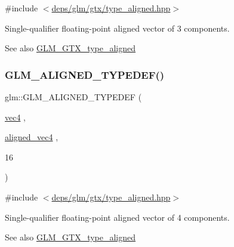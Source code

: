 {\ttfamily \#include $<$\hyperlink{gtx_2type__aligned_8hpp}{deps/glm/gtx/type\+\_\+aligned.\+hpp}$>$}

Single-\/qualifier floating-\/point aligned vector of 3 components. \begin{DoxySeeAlso}{See also}
\hyperlink{group__gtx__type__aligned}{G\+L\+M\+\_\+\+G\+T\+X\+\_\+type\+\_\+aligned} 
\end{DoxySeeAlso}
\mbox{\label{group__gtx__type__aligned_ga12fe7b9769c964c5b48dcfd8b7f40198}} 
\subsubsection{\texorpdfstring{G\+L\+M\+\_\+\+A\+L\+I\+G\+N\+E\+D\+\_\+\+T\+Y\+P\+E\+D\+E\+F()}{GLM\_ALIGNED\_TYPEDEF()}\hspace{0.1cm}{\footnotesize\ttfamily [146/209]}}
{\footnotesize\ttfamily glm\+::\+G\+L\+M\+\_\+\+A\+L\+I\+G\+N\+E\+D\+\_\+\+T\+Y\+P\+E\+D\+EF (\begin{DoxyParamCaption}\item[{\hyperlink{group__core__types_ga5881b1b022d7fd1b7218f5916532dd02}{vec4}}]{,  }\item[{\hyperlink{group__gtc__type__aligned_gad26d520694d7b865507819c2d9f2b196}{aligned\+\_\+vec4}}]{,  }\item[{16}]{ }\end{DoxyParamCaption})}



{\ttfamily \#include $<$\hyperlink{gtx_2type__aligned_8hpp}{deps/glm/gtx/type\+\_\+aligned.\+hpp}$>$}

Single-\/qualifier floating-\/point aligned vector of 4 components. \begin{DoxySeeAlso}{See also}
\hyperlink{group__gtx__type__aligned}{G\+L\+M\+\_\+\+G\+T\+X\+\_\+type\+\_\+aligned} 
\end{DoxySeeAlso}
\mbox{\label{group__gtx__type__aligned_gaefab04611c7f8fe1fd9be3071efea6cc}} 
